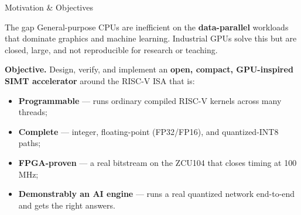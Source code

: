 \documentclass[aspectratio=169,11pt]{beamer}
\newcommand{\hl}[1]{{\color{simtixaccent}\textbf{#1}}}
\newcommand{\navy}[1]{{\color{simtixblue}\textbf{#1}}}
\begin{document}
\begin{frame}{Motivation \& Objectives}
  \begin{block}{The gap}
    General-purpose CPUs are inefficient on the \hl{data-parallel} workloads that
    dominate graphics and machine learning. Industrial GPUs solve this but are closed,
    large, and not reproducible for research or teaching.
  \end{block}
  \vspace{0.3em}
  \textbf{Objective.} Design, verify, and implement an \hl{open, compact, GPU-inspired
  SIMT accelerator} around the RISC-V ISA that is:
  \begin{itemize}
    \item \navy{Programmable} --- runs ordinary compiled RISC-V kernels across many threads;
    \item \navy{Complete} --- integer, floating-point (FP32/FP16), and quantized-INT8 paths;
    \item \navy{FPGA-proven} --- a real bitstream on the ZCU104 that closes timing at 100\,MHz;
    \item \navy{Demonstrably an AI engine} --- runs a real quantized network end-to-end and gets
      the right answers.
  \end{itemize}
\end{frame}
\end{document}
